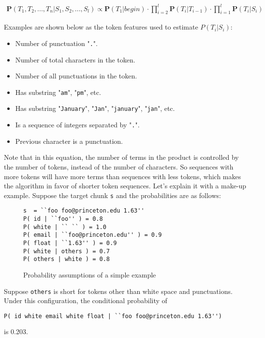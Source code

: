 \begin{eqnarray*}
\mathbf{P}(T_1, T_2, ..., T_n|S_1, S_2, ..., S_l) \propto
\mathbf{P}(T_1|begin) \cdot \prod_{i=2}^{l}\mathbf{P}(T_i|T_{i-1})
\cdot \prod_{i=1}^{l}\mathbf{P}(T_i|S_i)
\end{eqnarray*}

Examples are shown below as the token features used to estimate
$P(T_i|S_i)$:

\begin{itemize}
\item Number of punctuation "{\tt .}".
\item Number of total characters in the token.
\item Number of all punctuations in the token.
\item Has substring "{\tt am}", "{\tt pm}", etc.
\item Has substring "{\tt January}", "{\tt Jan}", "{\tt january}",
"{\tt jan}", etc.
\item Is a sequence of integers separated by "{\tt .}".
\item Previous character is a punctuation.
\end{itemize}

Note that in this equation, the number of terms in the product is
controlled by the number of tokens, instead of the number of
characters. So sequences with more tokens will have more terms than
sequences with less tokens, which makes the algorithm in favor of
shorter token sequences. Let's explain it with a make-up example.
Suppose the target chunk {\tt s} and the probabilities are as
follows:

\begin{figure}[t]
\begin{flushleft}
{\small
\begin{verbatim}
s  = ``foo foo@princeton.edu 1.63''
P( id | ``foo'' ) = 0.8
P( white | `` `` ) = 1.0
P( email | ``foo@princeton.edu'' ) = 0.9
P( float | ``1.63'' ) = 0.9
P( white | others ) = 0.7
P( others | white ) = 0.8
\end{verbatim}
}
\end{flushleft}
\caption{Probability assumptions of a simple example}
\end{figure}

Suppose {\tt others} is short for tokens other than white space and
punctuations. Under this configuration, the conditional probability
of
\begin{verbatim}
P( id white email white float | ``foo foo@princeton.edu 1.63'')
\end{verbatim}
is 0.203.

